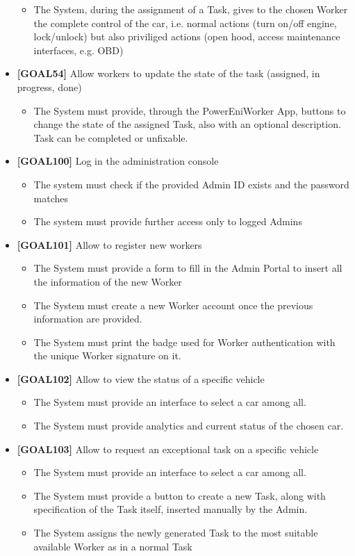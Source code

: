 \begin{itemize}
	\begin{itemize}
	\item The System, during the assignment of a Task, gives to the chosen Worker the complete control of the car, i.e. normal actions (turn on/off engine, lock/unlock) but also priviliged actions (open hood, access maintenance interfaces, e.g. OBD)
	\end{itemize}
\item \textbf{[GOAL54]} Allow workers to update the state of the task (assigned, in progress, done)
	\begin{itemize}
	\item The System must provide, through the PowerEniWorker App, buttons to change the state of the assigned Task, also with an optional description. Task can be completed or unfixable.
	\end{itemize}
\item \textbf{[GOAL100]} Log in the administration console
	\begin{itemize}
	\item The system must check if the provided Admin ID exists and the password matches
	\item The system must provide further access only to logged Admins
	\end{itemize}
\item \textbf{[GOAL101]} Allow to register new workers
	\begin{itemize}
	\item The System must provide a form to fill in the Admin Portal to insert all the information of the new Worker
	\item The System must create a new Worker account once the previous information are provided.
	\item The System must print the badge used for Worker authentication with the unique Worker signature on it.
	\end{itemize}
\item \textbf{[GOAL102]} Allow to view the status of a specific vehicle
	\begin{itemize}
	\item The System must provide an interface to select a car among all.
	\item The System must provide analytics and current status of the chosen car.
	\end{itemize}
\item \textbf{[GOAL103]} Allow to request an exceptional task on a specific vehicle
	\begin{itemize}
	\item The System must provide an interface to select a car among all.
	\item The System must provide a button to create a new Task, along with specification of the Task itself, inserted manually by the Admin.
	\item The System assigns the newly generated Task to the most suitable available Worker as in a normal Task
	\end{itemize}
\end{itemize}



